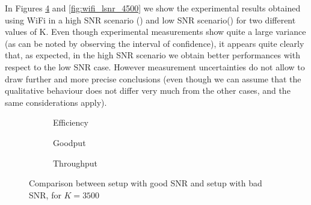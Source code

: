 In Figures \ref{fig:wifi_lsnr_3500} and \ref{fig:wifi_lsnr_4500} we show the experimental results obtained using WiFi in a high SNR scenario () and low SNR scenario() for two different values of K. Even though experimental measurements show quite a large variance (as can be noted by observing the interval of confidence), it appears quite clearly that, as expected, in the high SNR scenario we obtain better performances with respect to the low SNR case. However measurement uncertainties do not allow to draw further and more precise conclusions (even though we can assume that the qualitative behaviour does not differ very much from the other cases, and the same considerations apply).
\begin{figure}[!hp]
\centering
\begin{subfigure}{0.23\textwidth}
	\captionsetup{justification=centering,font=scriptsize}
	\centering
	\setlength\fwidth{\textwidth}
	\setlength{}
	
	\caption{Efficiency}
	\label{fig:wifi_eff_lsnr_3500}
\end{subfigure}\hspace{2em}%
\begin{subfigure}{0.23\textwidth}
	\captionsetup{justification=centering,font=scriptsize}
	\centering
	\setlength\fwidth{\textwidth}
	\setlength{}
	
	\caption{Goodput}
	\label{fig:wifi_good_lsnr_3500}
\end{subfigure}\hspace{2em}%
\begin{subfigure}{0.23\textwidth}
	\captionsetup{justification=centering,font=scriptsize}
	\centering
	\setlength\fwidth{\textwidth}
	\setlength{}
	
	\caption{Throughput}
	\label{fig:wifi_thr_lsnr_3500}
\end{subfigure}
\caption{Comparison between setup with good SNR and setup with bad SNR, for $K=3500$}
\label{fig:wifi_lsnr_3500}
\end{figure}
